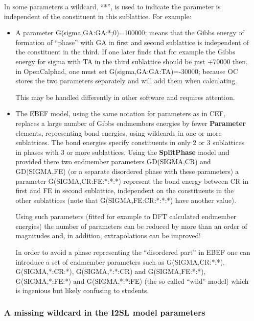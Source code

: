 \documentclass{article}
\begin{document}
In some parameters a wildcard, ``*'', is used to indicate the
parameter is independent of the constituent in this sublattice.  For
example:
\begin{itemize}
\item A parameter G(sigma,GA:GA:*;0)=100000; means that the Gibbs
  energy of formation of ``phase'' with GA in first and second
  sublattice is independent of the constituent in the third.  If one
  later finds that for example the Gibbs energy for sigma with TA in
  the third sublattice should be just +70000 then, in OpenCalphad, one
  must set G(sigma,GA:GA:TA)=-30000; because OC stores the two
  parameters separately and will add them when calculating.

This may be handled differently in other software and requires attention.

\item The EBEF model, using the same notation for parameters as in
  CEF, replaces a large number of Gibbs endmembers energies by fewer
  {\bf Parameter} elements, representing bond energies, using
  wildcards in one or more sublattices.  The bond energies specify
  constituents in only 2 or 3 sublattices in phases with 3 or more
  sublattices.  Using the {\bf SplitPhase} model and provided there
  two endmember parameters GD(SIGMA,CR) and GD(SIGMA,FE) (or a
  separate disordered phase with these parameters) a parameter
  G(SIGMA,CR:FE:*:*:*) represent the bond energy between CR in first
  and FE in second sublattice, independent on the constituents in the
  other sublattices (note that G(SIGMA,FE:CR:*:*:*) have another
  value).

  Using such parameters (fitted for example to DFT calculated
  endmember energies) the number of parameters can be reduced by more
  than an order of magnitudes and, in addition, extrapolations can be
  improved!

  In order to avoid a phase representing the ``disordered part'' in
  EBEF one can introduce a set of endmember parameters such as
  G(SIGMA,CR:*:*), G(SIGMA,*:CR:*), G(SIGMA,*:*:CR) and
  G(SIGMA,FE:*:*), G(SIGMA,*:FE:*) and G(SIGMA,*:*:FE) (the so called
  ``wild'' model) which is ingenious but likely confusing to students.
  
\end{itemize}

\subsubsection{A missing wildcard in the I2SL model parameters}
\end{document}
